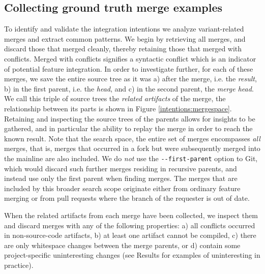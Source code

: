 \subsection{Collecting ground truth merge examples}
To identify and validate the integration intentions we analyze variant-related merges and extract common patterns. We begin by retrieving all merges, and discard those that merged cleanly, thereby retaining those that merged with conflicts. Merged with conflicts signifies a syntactic conflict which is an indicator of potential feature integration. In order to investigate further, for each of these merges, we save the entire source tree as it was 
a) after the merge, i.e. the \textit{result},
b) in the first parent, i.e. the \textit{head}, and
c) in the second parent, the \textit{merge head}. We call this triple of source trees the \textit{related artifacts} of the merge, the relationship between its parts is shown in Figure \ref{intentions:mergespace}. Retaining and inspecting the source trees of the parents allows for insights to be gathered, and in particular the ability to replay the merge in order to reach the known result. Note that the search space, the entire set of merges encompasses \textit{all} merges, that is, merges that occurred in a fork but were subsequently merged into the mainline are also included. We do \textit{not} use the \texttt{-{}-first-parent} option to Git, which would discard such further merges residing in recursive parents, and instead use only the first parent when finding merges. The merges that are included by this broader search scope originate either from ordinary feature merging or from pull requests where the branch of the requester is out of date.%

When the related artifacts from each merge have been collected, we inspect them and discard merges with any of the following properties: 
a) all conflicts occurred in non-source-code artifacts, b) at least one artifact cannot be compiled, c) there are only whitespace changes between the merge parents, or d) contain some project-specific uninteresting changes (see Results  for examples of uninteresting in practice).


